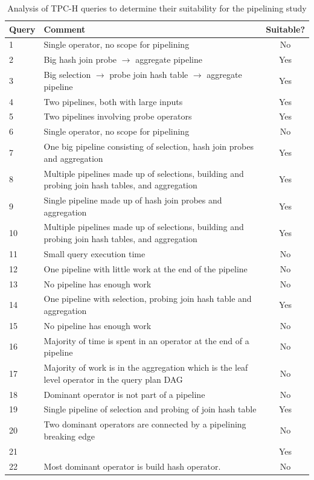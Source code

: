 \begin{table}[]
	\centering
	\begin{tabular}{|p{1.1cm}|p{14cm}|c|}
		\hline
		\textbf{Query} & \textbf{Comment} & \textbf{Suitable?} \\ \hline
		1 & Single operator, no scope for pipelining & No \\ \hline
		2 & Big hash join probe $\rightarrow$ aggregate pipeline & Yes \\ \hline
		3 & Big selection $\rightarrow$ probe join hash table $\rightarrow$ aggregate pipeline & Yes \\ \hline
		4 & Two pipelines, both with large inputs & Yes \\ \hline
		5 & Two pipelines involving probe operators & Yes \\ \hline
		6 & Single operator, no scope for pipelining & No \\ \hline
		7 & One big pipeline consisting of selection, hash join probes and aggregation & Yes \\ \hline
		8 & Multiple pipelines made up of selections, building and probing join hash tables, and aggregation & Yes \\ \hline
		9 & Single pipeline made up of hash join probes and aggregation & Yes \\ \hline
		10 & Multiple pipelines made up of selections, building and probing join hash tables, and aggregation & Yes \\ \hline
		11 & Small query execution time & No \\ \hline
		12 & One pipeline with little work at the end of the pipeline & No \\ \hline
		13 & No pipeline has enough work & No \\ \hline
		14 & One pipeline with selection, probing join hash table and aggregation & Yes \\ \hline
		15 & No pipeline has enough work & No \\ \hline
		16 & Majority of time is spent in an operator at the end of a pipeline & No \\ \hline
		17 & Majority of work is in the aggregation which is the leaf level operator in the query plan DAG & No \\ \hline
		18 & Dominant operator is not part of a pipeline & No \\ \hline
		19 & Single pipeline of selection and probing of join hash table & Yes \\ \hline
		20 & Two dominant operators are connected by a pipelining breaking edge & No \\ \hline
		21 & \todo{Redo} & Yes \\ \hline
		22 & Most dominant operator is build hash operator. & No \\ \hline
	\end{tabular}
	\caption{Analysis of TPC-H queries to determine their suitability for the pipelining study}
	\label{table:pipelining-suitability-tpch}
\end{table}


